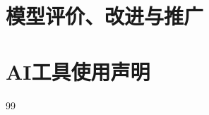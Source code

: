 \documentclass[withoutpreface,bwprint]{format}
\begin{document}


\section{模型评价、改进与推广}
\label{sec:evaluation}

\label{ai-statement:start}
\section*{AI工具使用声明}

\label{references:start}
\begin{thebibliography}{99}
\end{thebibliography}

\clearpage
\label{appendix:start}
\appendix
\renewcommand{\thesection}{附录\arabic{section}}
\renewcommand{\thesubsection}{附录\arabic{section}.\arabic{subsection}}
\end{document}
